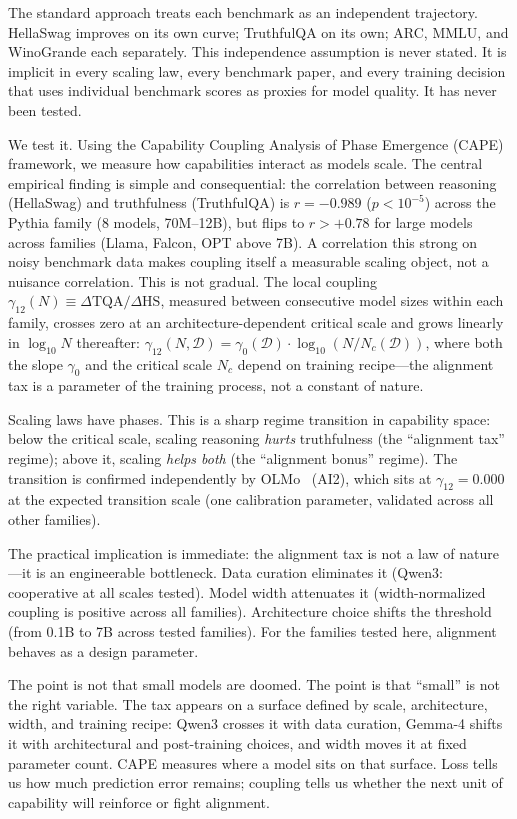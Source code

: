 \documentclass{article}
\begin{document}
The standard approach treats each benchmark as an independent trajectory.
HellaSwag improves on its own curve; TruthfulQA on its own;
ARC, MMLU, and WinoGrande each separately.
This independence assumption is never stated.
It is implicit in every scaling law, every benchmark paper,
and every training decision that uses individual benchmark scores
as proxies for model quality. It has never been tested.

We test it. Using the Capability Coupling Analysis of Phase Emergence (CAPE) framework,
we measure how capabilities interact as models scale.
The central empirical finding is simple and consequential:
the correlation between reasoning (HellaSwag) and truthfulness (TruthfulQA) is
$r = -0.989$ ($p < 10^{-5}$) across the Pythia family (8 models, 70M--12B),
but flips to $r > +0.78$ for large models across families (Llama, Falcon, OPT above 7B).
A correlation this strong on noisy benchmark data makes coupling itself
a measurable scaling object, not a nuisance correlation.
This is not gradual. The local coupling $\gamma_{12}(N) \equiv \Delta\mathrm{TQA}/\Delta\mathrm{HS}$,
measured between consecutive model sizes within each family,
crosses zero at an architecture-dependent critical scale and grows linearly in $\log_{10} N$ thereafter:
$\gamma_{12}(N, \mathcal{D}) = \gamma_0(\mathcal{D}) \cdot \log_{10}(N / N_c(\mathcal{D}))$,
where both the slope $\gamma_0$ and the critical scale $N_c$ depend on training recipe---the
alignment tax is a parameter of the training process, not a constant of nature.

Scaling laws have phases.
This is a sharp regime transition in capability space:
below the critical scale, scaling reasoning \emph{hurts} truthfulness
(the ``alignment tax'' regime);
above it, scaling \emph{helps both} (the ``alignment bonus'' regime).
The transition is confirmed independently by OLMo~\cite{groeneveld2024} (AI2),
which sits at $\gamma_{12} = 0.000$ at the expected transition scale
(one calibration parameter, validated across all other families).

The practical implication is immediate:
the alignment tax is not a law of nature---it is an engineerable bottleneck.
Data curation eliminates it (Qwen3: cooperative at all scales tested).
Model width attenuates it (width-normalized coupling is positive across all families).
Architecture choice shifts the threshold (from 0.1B to 7B across tested families).
For the families tested here, alignment behaves as a design parameter.

The point is not that small models are doomed.
The point is that ``small'' is not the right variable.
The tax appears on a surface defined by scale, architecture, width, and training recipe:
Qwen3 crosses it with data curation,
Gemma-4 shifts it with architectural and post-training choices,
and width moves it at fixed parameter count.
CAPE measures where a model sits on that surface.
Loss tells us how much prediction error remains;
coupling tells us whether the next unit of capability
will reinforce or fight alignment.
\end{document}
